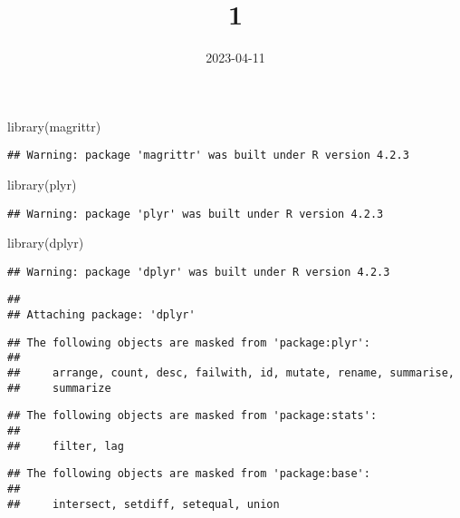 \documentclass[
]{article}
\title{1}
\author{}
\date{\vspace{-2.5em}2023-04-11}
\newenvironment{Shaded}{\begin{snugshade}}{\end{snugshade}}
\newcommand{\FunctionTok}[1]{\textcolor[rgb]{0.00,0.00,0.00}{#1}}
\newcommand{\NormalTok}[1]{#1}
\begin{document}
\maketitle

\begin{Shaded}
\begin{Highlighting}[]
\FunctionTok{library}\NormalTok{(magrittr)}
\end{Highlighting}
\end{Shaded}

\begin{verbatim}
## Warning: package 'magrittr' was built under R version 4.2.3
\end{verbatim}

\begin{Shaded}
\begin{Highlighting}[]
\FunctionTok{library}\NormalTok{(plyr)}
\end{Highlighting}
\end{Shaded}

\begin{verbatim}
## Warning: package 'plyr' was built under R version 4.2.3
\end{verbatim}

\begin{Shaded}
\begin{Highlighting}[]
\FunctionTok{library}\NormalTok{(dplyr)}
\end{Highlighting}
\end{Shaded}

\begin{verbatim}
## Warning: package 'dplyr' was built under R version 4.2.3
\end{verbatim}

\begin{verbatim}
## 
## Attaching package: 'dplyr'
\end{verbatim}

\begin{verbatim}
## The following objects are masked from 'package:plyr':
## 
##     arrange, count, desc, failwith, id, mutate, rename, summarise,
##     summarize
\end{verbatim}

\begin{verbatim}
## The following objects are masked from 'package:stats':
## 
##     filter, lag
\end{verbatim}

\begin{verbatim}
## The following objects are masked from 'package:base':
## 
##     intersect, setdiff, setequal, union
\end{verbatim}
\end{document}
